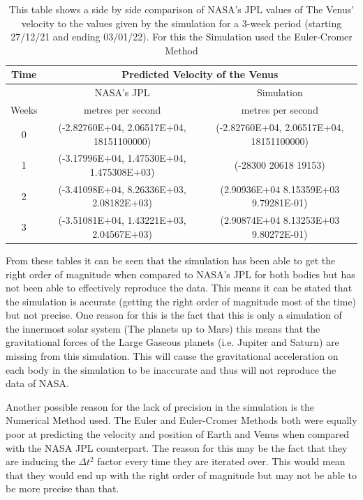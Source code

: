 \documentclass[a4paper,10pt]{article}
\begin{document}
\begin{table}[htb!]
\begin{center}
\begin{tabular}{|c|c|c|}
\hline 
Time & \multicolumn{2}{|c|}{Predicted Velocity of the Venus} \\
\hline
  & NASA's JPL & Simulation \\
Weeks & metres per second & metres per second\\
\hline
   0 & (-2.82760E+04, 2.06517E+04, 18151100000) & (-2.82760E+04, 2.06517E+04, 18151100000)  \\ 
   1 & (-3.17996E+04, 1.47530E+04, 1.475308E+03) & (-28300  20618  19153)  \\
   2 & (-3.41098E+04, 8.26336E+03, 2.08182E+03) & (2.90936E+04 8.15359E+03 9.79281E-01)   \\
   3 & (-3.51081E+04, 1.43221E+03, 2.04567E+03) & (2.90874E+04 8.13253E+03 9.80272E-01)   \\
\hline 
\end{tabular}
\end{center}
\caption{\label{table:Magnitude of Conserved Quantities} This table shows a side by side comparison of NASA's JPL values of The Venus' velocity to the values given by the simulation for a 3-week period (starting 27/12/21 and ending 03/01/22). For this the Simulation used the Euler-Cromer Method}
\end{table}

From these tables it can be seen that the simulation has been able to get the right order of magnitude when compared to NASA's JPL for both bodies but has not been able to effectively reproduce the data. This means it can be stated that the simulation is accurate (getting the right order of magnitude most of the time) but not precise. One reason for this is the fact that this is only a simulation of the innermost solar system (The planets up to Mars) this means that the gravitational forces of the Large Gaseous planets (i.e. Jupiter and Saturn) are missing from this simulation. This will cause the gravitational acceleration on each body in the simulation to be inaccurate and thus will not reproduce the data of NASA.

Another possible reason for the lack of precision in the simulation is the Numerical Method used. The Euler and Euler-Cromer Methods both were equally poor at predicting the velocity and position of Earth and Venus  when compared with the NASA JPL counterpart. The reason for this may be the fact that they are inducing the $\Delta t^{2}$ factor every time they are iterated over. This would mean that they would end up with the right order of magnitude but may not be able to be more precise than that.
\end{document}
